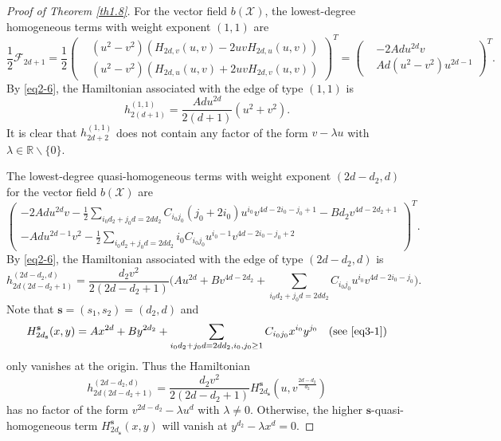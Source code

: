 \documentclass[reqno]{amsart}
\begin{document}
\begin{proof}[Proof of Theorem \ref{th1.8}]
For the vector field $b(\mathcal{X})$, the lowest-degree homogeneous terms with weight 
exponent $(1,1)$ are
\[
\frac{1}{2}\mathcal{F}_{2d+1}
=\frac{1}{2}\begin{pmatrix}
& (u^{2}-v^{2})(H_{2d,v}(u,v)-2uvH_{2d,u}(u,v)) \\
& (u^{2}-v^{2})(H_{2d,u}(u,v)+2uvH_{2d,v}(u,v))
\end{pmatrix}^T
= \begin{pmatrix}
& -2Adu^{2d}v \\
& Ad(u^2-v^2)u^{2d-1}
\end{pmatrix}^T.
\]
By \eqref{eq2-6}, the Hamiltonian associated with the edge of type $(1,1)$ is
\[
h_{2(d+1)}^{(1,1)}=\frac{Adu^{2d}}{2(d+1)}(u^2+v^2).
\]
It is clear that $h_{2d+2}^{(1,1)}$ does not contain any factor of the form 
$v-\lambda u$ with $\lambda \in \mathbb{R}\backslash\{0\}$.

The lowest-degree quasi-homogeneous terms with weight exponent $(2d-d_2, d)$ for the 
vector field $b(\mathcal{X})$ are
\[
\begin{pmatrix}
 -2Adu^{2d}v-\frac{1}{2}\sum_{i_0d_2+j_0d=2d d_{2}}C_{i_0j_0}(j_0+2i_0)u^{i_0}
 v^{4d-2i_0-j_0+1}-Bd_2v^{4d-2d_2+1}  \\
 -Adu^{2d-1}v^{2}-\frac{1}{2}\sum_{i_0d_2+j_0d=2d d_{2}}i_0C_{i_0j_0}u^{i_0-1}
 v^{4d-2i_0-j_0+2}
\end{pmatrix}^T.
\]
By \eqref{eq2-6}, the Hamiltonian associated with the edge of type $(2d-d_2, d)$ is
\[
h_{2d(2d-d_2+1)}^{(2d-d_2,d)}
=\frac{d_2v^{2}}{2(2d-d_2+1)}
\Big(Au^{2d}+Bv^{4d-2d_2}+\sum_{i_0d_2+j_0d=2d d_{2}}C_{i_0j_0}u^{i_0}v^{4d-2i_0-j_0}\Big).
\]
Note that $\mathbf{s}=(s_1,s_2)=(d_2, d)$ and
$$
H^{\mathbf{s}}_{2d_{\mathbf{s}}}(x,y)=Ax^{2d}
+By^{2d_2}+\sum_{i_0d_2+j_0d=2d d_{2}, i_0, j_0\geq1}C_{i_0j_0}x^{i_0}y^{j_0}\quad
 \text{(see \eqref{eq3-1})}
 $$
only vanishes at the origin. Thus the Hamiltonian
\[
h_{2d(2d-d_2+1)}^{(2d-d_2,d)}
=\frac{d_2v^{2}}{2(2d-d_2+1)}H^{\mathbf{s}}_{2d_{\mathbf{s}}}
\left(u,v^{\frac{2d-d_2}{d_2}}\right)
\]
has no factor of the form $v^{2d-d_2}-\lambda u^{d}$ with $\lambda\neq 0$. 
Otherwise, the higher $\mathbf{s}$-quasi-homogeneous term 
$H^{\mathbf{s}}_{2d_{\mathbf{s}}}(x,y)$ will vanish at $y^{d_2}-\lambda x^d=0$.
\smallskip


\end{proof}
\end{document}
